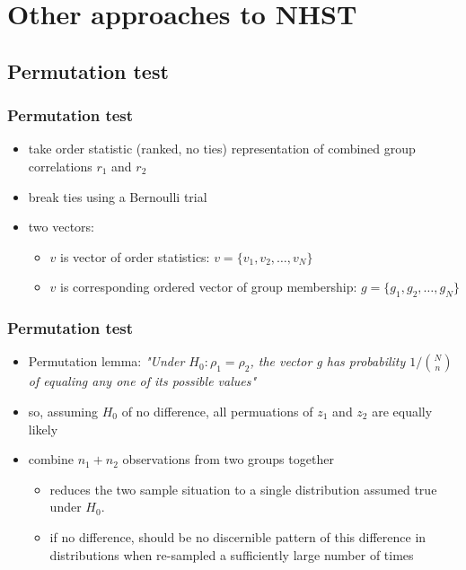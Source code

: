 \documentclass{beamer}
\begin{document}
 
  
  \section{Other approaches to NHST}
  \subsection{Permutation test}
  \begin{frame}
    \frametitle{Permutation test }  
    \begin{itemize}
		  \item take order statistic (ranked, no ties) representation of combined group correlations \(r_1\) and \(r_2\) 
	  	\item break ties using a Bernoulli trial
	  	\item two vectors:
      \begin{itemize}
				\item \(v\) is vector of order statistics: \(v = \{v_1, v_2,\ldots, v_N\}\)
			  \item \(v\) is corresponding ordered vector of group membership: \(g = \{g_1, g_2,\ldots, g_N\}\)
      \end{itemize}
    \end{itemize}
  \end{frame} 
  
  \begin{frame}
    \frametitle{Permutation test }  
    \begin{itemize}
	  	\item Permutation lemma: \it{"Under \(H_0: \rho_1 = \rho_2\), the vector g has probability \(1/\binom{N}{n}\) of equaling any one of its possible values"}
      \item so, assuming \(H_0\) of no difference, all permuations of \(z_1\) and \(z_2\) are equally likely
  		\item combine \(n_1 + n_2\) observations from two groups together
      \begin{itemize}
        \item reduces the two sample situation to a single distribution assumed true under \(H_0\).
	    	\item if no difference, should be no discernible pattern of this difference in distributions when re-sampled a sufficiently large number of times
      \end{itemize}
    \end{itemize}
  \end{frame} 
      
\end{document}
